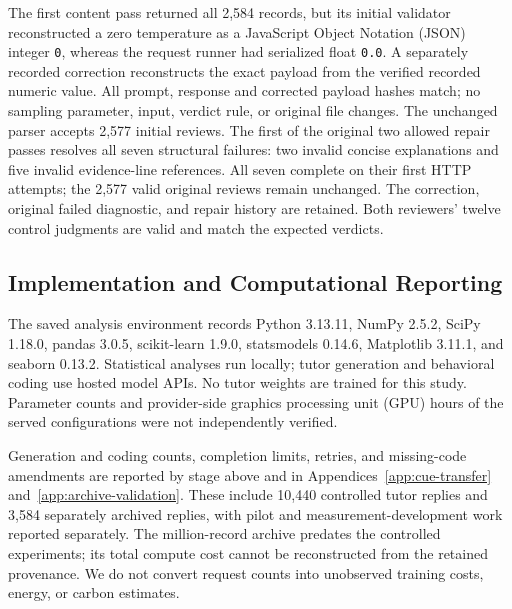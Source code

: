 The first content pass returned all 2,584 records, but its initial validator
reconstructed a zero temperature as a JavaScript Object Notation (JSON)
integer \texttt{0}, whereas the
request runner had serialized float \texttt{0.0}. A separately recorded
correction reconstructs the exact payload from the verified recorded numeric
value. All prompt, response and corrected payload hashes match; no sampling
parameter, input, verdict rule, or original file changes. The unchanged parser
accepts 2,577 initial reviews. The first of the original two allowed repair
passes resolves all seven structural failures: two invalid concise explanations
and five invalid evidence-line references. All seven complete on their first
HTTP attempts; the 2,577 valid original reviews remain unchanged. The correction,
original failed diagnostic, and repair history are retained. Both reviewers'
twelve control judgments are valid and match the expected verdicts.

\subsection{Implementation and Computational Reporting}
\label{app:implementation}
The saved analysis environment records Python 3.13.11, NumPy 2.5.2,
SciPy 1.18.0, pandas 3.0.5, scikit-learn 1.9.0, statsmodels 0.14.6,
Matplotlib 3.11.1, and seaborn 0.13.2. Statistical analyses run locally;
tutor generation and behavioral coding use hosted model APIs. No tutor
weights are trained for this study. Parameter counts and provider-side graphics processing unit (GPU)
hours of the served configurations were not independently verified.

Generation and coding counts, completion limits, retries, and missing-code
amendments are reported by stage above and in
Appendices~\ref{app:cue-transfer} and~\ref{app:archive-validation}.
These include 10,440 controlled tutor replies and 3,584 separately archived
replies, with pilot and measurement-development work reported separately.
The million-record archive predates the controlled experiments; its total
compute cost cannot be reconstructed from the retained provenance. We do not
convert request counts into unobserved training costs, energy, or carbon estimates.

